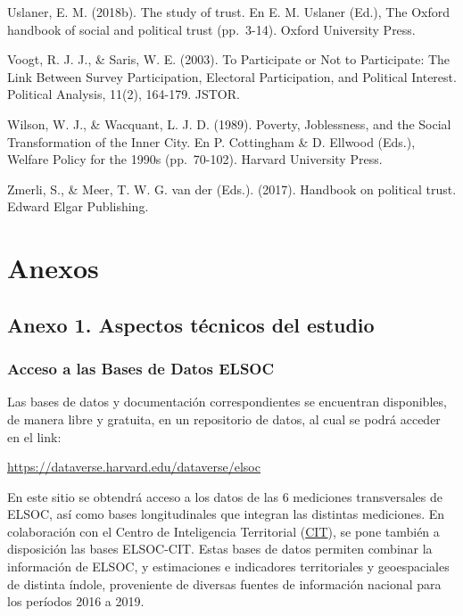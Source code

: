 \documentclass[
  12pt,
]{book}
\begin{document}
Uslaner, E. M. (2018b). The study of trust. En E. M. Uslaner (Ed.), The Oxford handbook of social and political trust (pp.~3-14). Oxford University Press.

Voogt, R. J. J., \& Saris, W. E. (2003). To Participate or Not to Participate: The Link Between Survey Participation, Electoral Participation, and Political Interest. Political Analysis, 11(2), 164-179. JSTOR.

Wilson, W. J., \& Wacquant, L. J. D. (1989). Poverty, Joblessness, and the Social Transformation of the Inner City. En P. Cottingham \& D. Ellwood (Eds.), Welfare Policy for the 1990s (pp.~70-102). Harvard University Press.

Zmerli, S., \& Meer, T. W. G. van der (Eds.). (2017). Handbook on political trust. Edward Elgar Publishing.

\hypertarget{anexos}{%
\chapter*{Anexos}\label{anexos}}

\hypertarget{anexo-1.-aspectos-tuxe9cnicos-del-estudio}{%
\section*{Anexo 1. Aspectos técnicos del estudio}\label{anexo-1.-aspectos-tuxe9cnicos-del-estudio}}

\hypertarget{acceso-a-las-bases-de-datos-elsoc}{%
\subsection*{Acceso a las Bases de Datos ELSOC}\label{acceso-a-las-bases-de-datos-elsoc}}

Las bases de datos y documentación correspondientes se encuentran disponibles, de manera libre y gratuita, en un repositorio de datos, al cual se podrá acceder en el link:

\url{https://dataverse.harvard.edu/dataverse/elsoc}

En este sitio se obtendrá acceso a los datos de las 6 mediciones transversales de ELSOC, así como bases longitudinales que integran las distintas mediciones. En colaboración con el Centro de Inteligencia Territorial (\href{https://cit.uai.cl/}{CIT}), se pone también a disposición las bases ELSOC-CIT. Estas bases de datos permiten combinar la información de ELSOC, y estimaciones e indicadores territoriales y geoespaciales de distinta índole, proveniente de diversas fuentes de información nacional para los períodos 2016 a 2019.
\end{document}
